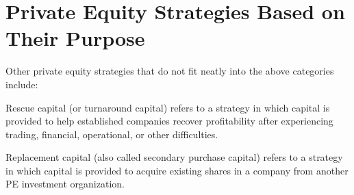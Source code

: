 \documentclass[11pt]{article}
\begin{document}
\section*{Private Equity Strategies Based on Their Purpose}
Other private equity strategies that do not fit neatly into the above categories include:

Rescue capital (or turnaround capital) refers to a strategy in which capital is provided to help established companies recover profitability after experiencing trading, financial, operational, or other difficulties.

Replacement capital (also called secondary purchase capital) refers to a strategy in which capital is provided to acquire existing shares in a company from another PE investment organization.
\end{document}
